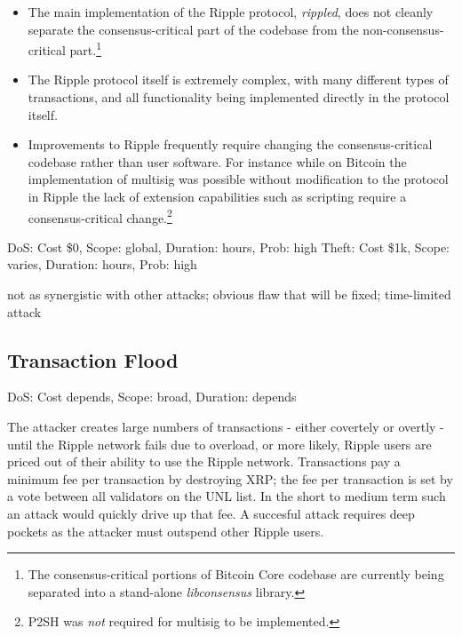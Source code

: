 \documentclass{article}
\begin{document}
\begin{itemize}

    \item The main implementation of the Ripple protocol, \emph{rippled}, does
        not cleanly separate the consensus-critical part of the codebase from
        the non-consensus-critical part.\footnote{The consensus-critical
            portions of Bitcoin Core codebase are currently being separated
            into a stand-alone \emph{libconsensus} library.}

    \item The Ripple protocol itself is extremely complex, with many different
          types of transactions, and all functionality being implemented directly
          in the protocol itself.

    \item Improvements to Ripple frequently require changing the
          consensus-critical codebase rather than user software. For instance
          while on Bitcoin the implementation of multisig was possible without
          modification to the protocol\cite{bip19} in Ripple the lack of
          extension capabilities such as scripting require a consensus-critical
          change.\cite{ripple-wiki-multisign}\footnote{P2SH was \emph{not}
          required for multisig to be implemented.}

\end{itemize}

DoS: Cost \$0, Scope: global, Duration: hours, Prob: high
Theft: Cost \$1k, Scope: varies, Duration: hours, Prob: high

not as synergistic with other attacks; obvious flaw that will be fixed;
time-limited attack


\subsection{Transaction Flood}

DoS: Cost depends, Scope: broad, Duration: depends

The attacker creates large numbers of transactions - either covertely or
overtly - until the Ripple network fails due to overload, or more likely,
Ripple users are priced out of their ability to use the Ripple network.
Transactions pay a minimum fee per transaction by destroying XRP; the fee per
transaction is set by a vote between all validators on the UNL list. In the
short to medium term such an attack would quickly drive up that fee. A
succesful attack requires deep pockets as the attacker must outspend other
Ripple users.
\end{document}
